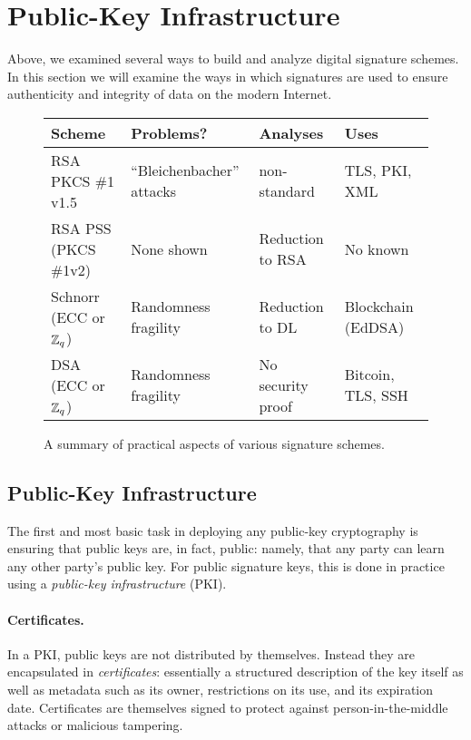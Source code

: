 \section*{Public-Key Infrastructure}
\label{sec:idprots_contd}

Above, we examined several ways to build and analyze digital signature schemes.
In this section we will examine the ways in which signatures are used to
ensure authenticity and integrity of data on the modern Internet.



\begin{figure}[t]
  \centering
  \begin{tabular}{|l|l|p{4cm}|p{4.2cm}|}
    \hline
    Scheme & Problems? & Analyses & Uses\\
    \hline
    \hline
    RSA PKCS \#1 v1.5 & ``Bleichenbacher'' attacks & non-standard~\cite{jager2018security} & TLS, PKI, XML\\
    \hline
    RSA PSS (PKCS \#1v2) & None shown & Reduction to RSA~\cite{bellare1998pss} & No known\\
    \hline
    Schnorr (ECC or ${{\mathbb Z}}_q$) & Randomness fragility &  Reduction to DL~\cite{schnorr1989efficient} & Blockchain (EdDSA)~\cite{eddsa}\\
    \hline
    DSA (ECC or ${{\mathbb Z}}_q$) & Randomness fragility~\cite{ecdsa_ps3} & No security proof & Bitcoin, TLS, SSH\\
    \hline
    \end{tabular}
    \caption{A summary of practical aspects of various signature schemes.}
    \label{fig:realworld-sigs}
  \end{figure}
    



\subsection{Public-Key Infrastructure}
\label{sec:idprots_contd:pki}

The first and most basic task in deploying any public-key cryptography is ensuring that public keys are, in fact, public: namely, that any party can learn any other party's public key. For public signature keys, this is done in practice using a
\emph{public-key infrastructure} (PKI).

\paragraph{Certificates.} In a PKI, public keys are not distributed by themselves.
Instead they are encapsulated in \emph{certificates}: essentially a structured
description of the key itself as well as metadata such as its owner, restrictions
on its use, and its expiration date. Certificates are themselves signed to protect
against person-in-the-middle attacks or malicious tampering.

